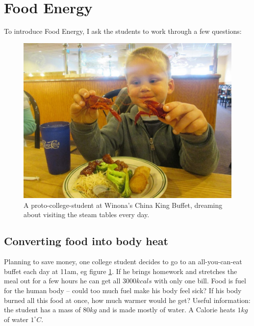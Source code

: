 \documentclass[11pt,letter]{article}
\begin{document}
\section{Food Energy}

To introduce Food Energy, I ask the students to work through a few questions:

\begin{figure}[h]
\centering
\includegraphics[width=\columnwidth]{at_the_buffet.jpg}
\caption{
A proto-college-student at 
Winona's China King Buffet, dreaming about visiting the steam tables every day. 
}
\label{buffet}
\end{figure}

\subsection{Converting food into body heat}
Planning to save money, one college student decides to go to an all-you-can-eat buffet each day at 11am, eg figure \ref{buffet}.  If he brings homework and stretches the meal out for a few hours he can get all $3000kcals$ with only one bill.  Food is fuel for the human body -- could too much fuel make his body feel sick? If his body burned all this food at once, how much warmer would he get? 
Useful information: the student has a mass of $80kg$ and is made mostly of water.  A Calorie heats $1 kg$ of water $1^{\circ}C$. 
\end{document}
